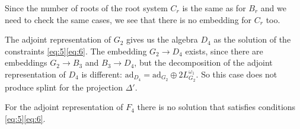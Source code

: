 \documentclass[12pt]{iopart}
\newcommand{\gf}{\mathfrak{g}}
\newcommand{\af}{\mathfrak{a}}
\begin{document}
Since the number of roots of the root system $C_{r}$ is the same as for $B_{r}$ and we need to check the
same cases, we see that there is no embedding for $C_{r}$ too. 

The adjoint representation of $G_{2}$ gives us the algebra $D_{4}$ as the solution of the
constraints \ref{eq:5}\ref{eq:6}. The embedding $G_{2}\to D_{4}$ exists, since there are
embeddings $G_{2}\to B_{3}$ and $B_{3}\to D_{4}$, but the decomposition of the adjoint representation of
$D_{4}$ is different: $ \mathrm{ad}_{D_{4}}=\mathrm{ad}_{G_{2}}\oplus 2 L^{\omega_{1}}_{G_{2}}$. So
this case does not produce splint for the projection $\Delta'$. 

For the adjoint representation of $F_{4}$ there is no solution that satisfies conditions
\ref{eq:5}\ref{eq:6}. 

\end{document}
